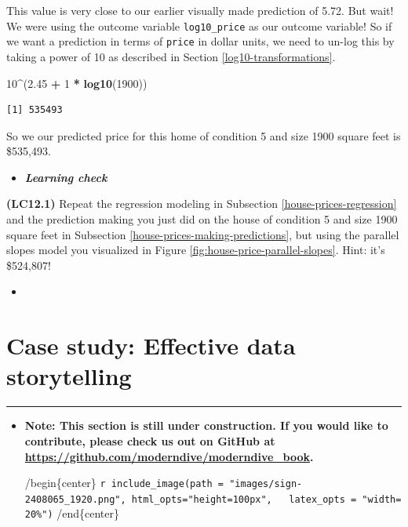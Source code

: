 \documentclass[12pt,]{krantz}
\makeatletter
\newenvironment{Shaded}{\begin{snugshade}}{\end{snugshade}}
\newcommand{\KeywordTok}[1]{\textcolor[rgb]{0.27,0.27,0.27}{\textbf{#1}}}
\newcommand{\DecValTok}[1]{\textcolor[rgb]{0.06,0.06,0.06}{#1}}
\newcommand{\FloatTok}[1]{\textcolor[rgb]{0.06,0.06,0.06}{#1}}
\newcommand{\StringTok}[1]{\textcolor[rgb]{0.5,0.5,0.5}{#1}}
\newcommand{\OperatorTok}[1]{\textcolor[rgb]{0.43,0.43,0.43}{\textbf{#1}}}
\newcommand{\NormalTok}[1]{#1}
\newenvironment{kframe}{%
\medskip{}
\setlength{\fboxsep}{.8em}
 \def\at@end@of@kframe{}%
 \ifinner\ifhmode%
  \def\at@end@of@kframe{\end{minipage}}%
  \begin{minipage}{\columnwidth}%
 \fi\fi%
 \def\FrameCommand##1{\hskip\@totalleftmargin \hskip-\fboxsep
 \colorbox{shadecolor}{##1}\hskip-\fboxsep
     \hskip-\linewidth \hskip-\@totalleftmargin \hskip\columnwidth}%
 \MakeFramed {\advance\hsize-\width
   \@totalleftmargin\z@ \linewidth\hsize
   \@setminipage}}%
 {\par\unskip\endMakeFramed%
 \at@end@of@kframe}
\renewenvironment{Shaded}{\begin{kframe}}{\end{kframe}}
\newenvironment{rmdblock}[1]
  {\begin{shaded*}
  \begin{itemize}
  \renewcommand{\labelitemi}{
    \raisebox{-.7\height}[0pt][0pt]{
    }
  }
  \item
  }
  {
  \end{itemize}
  \end{shaded*}
  }
\newenvironment{learncheck}
  {\begin{rmdblock}{warning}}
  {\end{rmdblock}}
\makeatother
\begin{document}
This value is very close to our earlier visually made prediction of
5.72. But wait! We were using the outcome variable \texttt{log10\_price}
as our outcome variable! So if we want a prediction in terms of
\texttt{price} in dollar units, we need to un-log this by taking a power
of 10 as described in Section \ref{log10-transformations}.

\begin{Shaded}
\begin{Highlighting}[]
\DecValTok{10}\OperatorTok{^}\NormalTok{(}\FloatTok{2.45} \OperatorTok{+}\StringTok{ }\DecValTok{1} \OperatorTok{*}\StringTok{ }\KeywordTok{log10}\NormalTok{(}\DecValTok{1900}\NormalTok{))}
\end{Highlighting}
\end{Shaded}

\begin{verbatim}
[1] 535493
\end{verbatim}

So we our predicted price for this home of condition 5 and size 1900
square feet is \$535,493.

\begin{learncheck}
\textbf{\emph{Learning check}}
\end{learncheck}

\textbf{(LC12.1)} Repeat the regression modeling in Subsection
\ref{house-prices-regression} and the prediction making you just did on
the house of condition 5 and size 1900 square feet in Subsection
\ref{house-prices-making-predictions}, but using the parallel slopes
model you visualized in Figure \ref{fig:house-price-parallel-slopes}.
Hint: it's \$524,807!

\begin{learncheck}

\end{learncheck}

\section{Case study: Effective data storytelling}\label{data-journalism}

\begin{center}\rule{0.5\linewidth}{\linethickness}\end{center}

\begin{learncheck}
\textbf{Note: This section is still under construction. If you would
like to contribute, please check us out on GitHub at
\url{https://github.com/moderndive/moderndive_book}.}

/begin\{center\}
\texttt{r\ include\_image(path\ =\ "images/sign-2408065\_1920.png",\ html\_opts="height=100px",\ \ \ latex\_opts\ =\ "width=20\%")}
/end\{center\}
\end{learncheck}
\end{document}
